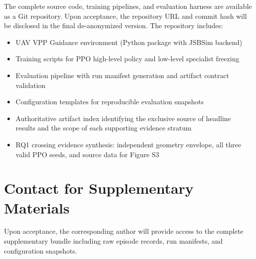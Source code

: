\documentclass[11pt,a4paper]{article}
\begin{document}
The complete source code, training pipelines, and evaluation harness are available as a Git repository. Upon acceptance, the repository URL and commit hash will be disclosed in the final de-anonymized version. The repository includes:

\begin{itemize}
    \item UAV VPP Guidance environment (Python package with JSBSim backend)
    \item Training scripts for PPO high-level policy and low-level specialist freezing
    \item Evaluation pipeline with run manifest generation and artifact contract validation
    \item Configuration templates for reproducible evaluation snapshots
    \item Authoritative artifact index identifying the exclusive source of headline results and the scope of each supporting evidence stratum
    \item RQ1 crossing evidence synthesis: independent geometry envelope, all three valid PPO seeds, and source data for Figure S3
\end{itemize}

\section*{Contact for Supplementary Materials}

Upon acceptance, the corresponding author will provide access to the complete supplementary bundle including raw episode records, run manifests, and configuration snapshots.
\end{document}
